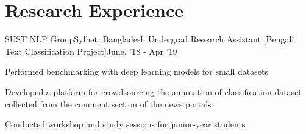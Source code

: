 
\section{\textbf{Research Experience}}
\vspace{-0.4mm}
  \resumeSubHeadingListStart
  \resumeSubheading
      {{SUST NLP Group}}{Sylhet, Bangladesh}
      {Undergrad Research Assistant [Bengali Text Classification Project]}{June. '18 - Apr '19}
      \resumeItemListStart
        \item Performed benchmarking with deep learning models for small datasets
        \item Developed a platform for crowdsourcing the annotation of classification dataset collected from the comment section of the news portals
        \item Conducted workshop and study sessions for junior-year students    
      \resumeItemListEnd 
  \resumeSubHeadingListEnd
\vspace{-6mm}